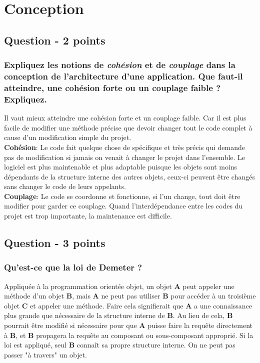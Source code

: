 \section{Conception}



\subsection{Question - 2 points}



\subsubsection{Expliquez les notions de \textit{cohésion} et de \textit{couplage} dans la conception de l’architecture d’une application. Que faut-il atteindre, une cohésion forte ou un couplage faible ? Expliquez.}
\color[rgb]{0,0.48,0.58}
Il vaut mieux atteindre une cohésion forte et un couplage faible. Car il est plus facile de modifier une méthode précise que devoir changer tout le code complet à cause d'un modification simple du projet.
\\\textbf{Cohésion}: Le code fait quelque chose de spécifique et très précis qui demande pas de modification si jamais on venait à changer le projet dans l'ensemble. Le logiciel est plus maintenable et plus adaptable puisque les objets sont moins dépendants de la structure interne des autres objets, ceux-ci peuvent être changés sans changer le code de leurs appelants.
\\\textbf{Couplage}: Le code se coordonne et fonctionne, si l'un change, tout doit être modifier pour garder ce couplage. Quand l'interdépendance entre les codes du projet est trop importante, la maintenance est difficile.
\color[rgb]{0,0,0}



\subsection{Question - 3 points}



\subsubsection{Qu'est-ce que la loi de Demeter ?}
\textcolor[rgb]{0,0.48,0.58}{Appliquée à la programmation orientée objet, un objet \textbf{A} peut appeler une méthode d'un objet \textbf{B}, mais \textbf{A} ne peut pas utiliser \textbf{B} pour accéder à un troisième objet \textbf{C} et appeler une méthode. Faire cela signifierait que \textbf{A} a une connaissance plus grande que nécessaire de la structure interne de \textbf{B}. Au lieu de cela, \textbf{B} pourrait être modifié si nécessaire pour que \textbf{A} puisse faire la requête directement à \textbf{B}, et \textbf{B} propagera la requête au composant ou sous-composant approprié. Si la loi est appliqué, seul \textbf{B} connaît sa propre structure interne. On ne peut pas passer "à travers" un objet.}


